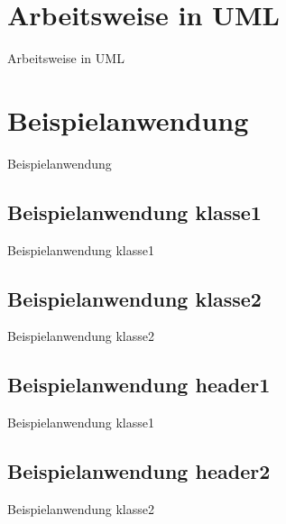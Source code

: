 \documentclass[12pt]{beamer}
\begin{document}
\section{Arbeitsweise in UML}
\begin{frame}{Arbeitsweise in UML}

\end{frame}
\section{Beispielanwendung}
\begin{frame}{Beispielanwendung}

\end{frame}
\subsection{Beispielanwendung klasse1}
\begin{frame}{Beispielanwendung klasse1}

\end{frame}
\subsection{Beispielanwendung klasse2}
\begin{frame}{Beispielanwendung klasse2}

\end{frame}
\subsection{Beispielanwendung header1}
\begin{frame}{Beispielanwendung klasse1}

\end{frame}
\subsection{Beispielanwendung header2}
\begin{frame}{Beispielanwendung klasse2}

\end{frame}
\end{document}
